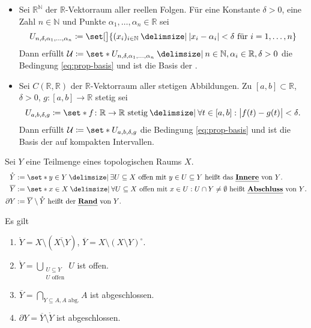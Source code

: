 \begin{beispiel}[{name=[Topologien definiert durch Basen]},label=bsp:pktw-konv]
	\begin{itemize}
		\item Sei $\mathbb{R}^\mathbb{N}$ der $\mathbb{R}$-Vektorraum aller reellen Folgen. 
		Für eine Konstante $\delta >0$, eine Zahl $n \in \mathbb{N}$ und Punkte $\alpha_1, \ldots , \alpha_n \in \mathbb{R}$ sei
		\[
			U_{n, \delta , \alpha_1, \ldots , \alpha_n} \coloneqq \set[\big]{(x_i)_{i \in \mathbb{N}} \given \abs*{x_i - \alpha_i} < \delta \text{ für } i=1, \ldots ,n } 
		\]
		Dann erfüllt $\mathcal{U} \coloneqq \set*{U_{n, \delta , \alpha_1, \ldots , \alpha_n} \given n \in \mathbb{N}, \alpha_i \in \mathbb{R}, \delta >0}$ die Bedingung \eqref{eq:prop-basis} und ist die Basis der .
		\item Sei $C(\mathbb{R},\mathbb{R})$ der $\mathbb{R}$-Vektorraum aller stetigen Abbildungen. 
		Zu $[a,b] \subset \mathbb{R}$, $\delta >0$, $g \colon [a,b] \to \mathbb{R}$ stetig sei
		\[
			U_{a,b, \delta , g} \coloneqq \set*{f \colon \mathbb{R} \to \mathbb{R} \text{ stetig} \given \forall t \in [a,b] : \abs[\big]{f(t)- g(t)}< \delta}. 
		\]
		Dann erfüllt $\mathcal{U} \coloneqq \set*{U_{a,b,\delta ,g}}$ die Bedingung \eqref{eq:prop-basis} und ist die Basis der  auf kompakten Intervallen.
	\end{itemize}
\end{beispiel}

\begin{definition}[{name=[{Inneres, Abschluss und Rand einer Teilmenge}]}]
	Sei $Y$ eine Teilmenge eines topologischen Raums $X$.
	\begin{align*}
		\mathring Y &:= \set*{y \in Y \given  \exists U \subseteq X \text{ offen mit } y \in U \subseteq Y} \text{ heißt das \Index{Innere} von $Y$.} \\ 
		\overline{Y} &:= \set*{x \in X \given \forall U \subseteq X \text{ offen mit } x \in U : U \cap Y \not= \emptyset}    \text{ heißt \Index{Abschluss} von $Y$.} \\
		\partial Y &:= \overline{Y} \setminus \mathring Y \text{ heißt der \Index{Rand} von $Y$.} 
	\end{align*}
\end{definition}

\begin{bemerkung}[{name=[{Eigenschaften von Innerem, Abschluss und Rand}]}]
	Es gilt
	\begin{enumerate}[1)]
		\item $\mathring Y = X \setminus (\overline{X \setminus Y} )$, $\overline{Y} = X \setminus (X \setminus Y)^\circ$.
		\item $\mathring Y = \bigcup_{\substack{U \subseteq Y \\ U \text{ offen}}} U$ ist offen.
		\item $\overline{Y} = \bigcap_{Y \subseteq A, A \text{ abg.}} A$ ist abgeschlossen.
		\item $\partial Y = \overline{Y} \setminus \mathring Y $ ist abgeschlossen.
	\end{enumerate}
\end{bemerkung}

